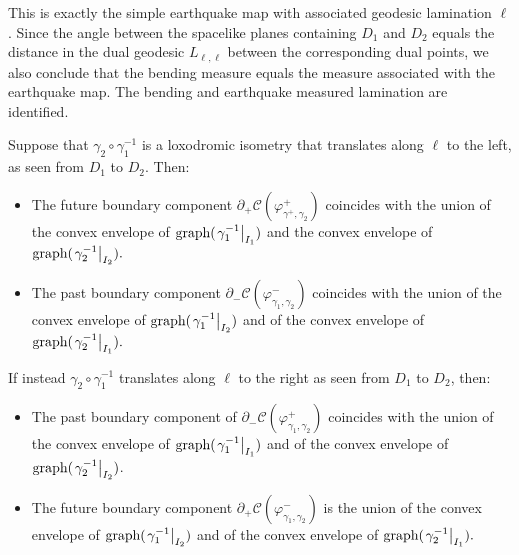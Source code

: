     This is exactly the simple earthquake map with associated geodesic lamination $\ell$. Since the angle between the spacelike planes containing $D_1$ and $D_2$ equals the distance in the dual geodesic $L_{\ell,\ell}$ between the corresponding dual points, we also conclude that the bending measure equals the measure associated with the earthquake map. The bending and earthquake measured lamination are identified. 
\begin{proposition}\label{gettinthere}
    Suppose that $\gamma_2\circ\gamma_1^{-1}$ is a loxodromic isometry that translates along $\ell$ to the left, as seen from $D_1$ to $D_2$. Then:
    \begin{itemize}
        \item The future boundary component $\partial_+\mathcal{C}(\varphi_{\gamma^+,\gamma_2}^{+})$ coincides with the union of the convex envelope of $\text{graph}(\left.\gamma_1^{-1}\right|_{I_1})$ and the convex envelope of $\text{graph}(\left.\gamma_2^{-1}\right|_{I_2}).$
        \item The past boundary component $\partial_-\mathcal{C}(\varphi^-_{\gamma_1,\gamma_2})$ coincides with the union of the convex envelope of $\text{graph}(\left.\gamma_1^{-1}\right|_{I_2})$ and of the convex envelope of $\text{graph}(\left.\gamma_2^{-1}\right|_{I_1}).$
    \end{itemize}
    If instead $\gamma_2\circ\gamma_1^{-1}$ translates along $\ell$ to the right as seen from $D_1$ to $D_2$, then:
    \begin{itemize}
        \item The past boundary component of $\partial_-\mathcal{C}(\varphi_{\gamma_1,\gamma_2}^+)$ coincides with the union of the convex envelope of $\text{graph}(\left.\gamma_1^{-1}\right|_{I_1})$ and of the convex envelope of $\text{graph}(\left.\gamma_2^{-1}\right|_{I_2})$. 
        \item The future boundary component $\partial_+\mathcal{C}(\varphi_{\gamma_1,\gamma_2}^-)$ is the union of the convex envelope of $\text{graph}(\left.\gamma_1^{-1}\right|_{I_2})$ and of the convex envelope of $\text{graph}(\left.\gamma_2^{-1}\right|_{I_1}).$
    \end{itemize}
\end{proposition}

